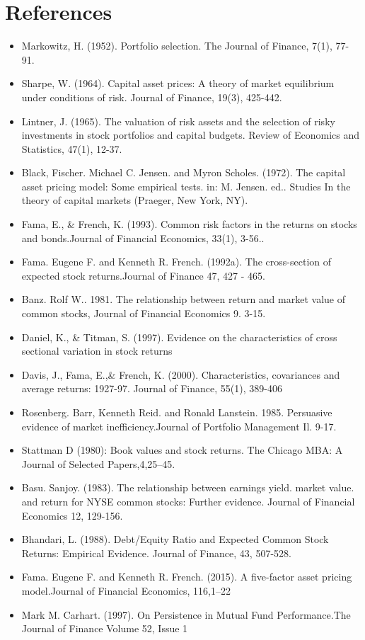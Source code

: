 \documentclass[12pt]{article}
\begin{document}
	\section{References} %
\begin{itemize}
	\item Markowitz, H. (1952). Portfolio selection. The Journal of Finance, 7(1), 77-91.
	\item Sharpe, W. (1964). Capital asset prices: A theory of market equilibrium under conditions of risk. Journal of Finance, 19(3), 425-442.
	\item Lintner, J. (1965). The valuation of risk assets and the selection of risky investments in stock portfolios and capital budgets. Review of Economics and Statistics, 47(1), 12-37.
	\item Black, Fischer. Michael C. Jensen. and Myron Scholes. (1972). The capital asset pricing model: Some empirical tests. in: M. Jensen. ed.. Studies In the theory of capital markets (Praeger, New York, NY).
	\item Fama, E., \& French, K. (1993). Common risk factors in the returns on stocks and bonds.Journal of Financial Economics, 33(1), 3-56..
	\item Fama. Eugene F. and Kenneth R. French. (1992a). The cross-section of expected stock returns.Journal of Finance 47, 427 - 465.
	\item Banz. Rolf W.. 1981. The relationship between return and market value of common stocks, Journal	of Financial Economics 9. 3-15.
	\item Daniel, K., \& Titman, S. (1997). Evidence on the characteristics of cross sectional variation in stock returns
	\item Davis, J., Fama, E.,\& French, K. (2000). Characteristics, covariances and average returns: 1927-97. Journal of Finance, 55(1), 389-406
	\item Rosenberg. Barr, Kenneth Reid. and Ronald Lanstein. 1985. Persuasive evidence of market inefficiency.Journal of Portfolio Management Il. 9-17.
	\item Stattman D (1980): Book values and stock returns. The Chicago MBA: A Journal of Selected Papers,4,25–45. 
	\item Basu. Sanjoy. (1983). The relationship between earnings yield. market value. and return for NYSE common stocks: Further evidence. Journal of Financial Economics 12, 129-156.
	\item Bhandari, L. (1988). Debt/Equity Ratio and Expected Common Stock Returns: Empirical Evidence. Journal of Finance, 43, 507-528. 
	\item Fama. Eugene F. and Kenneth R. French. (2015). A five-factor asset pricing model.Journal of Financial Economics, 116,1–22
	\item Mark M. Carhart. (1997). On Persistence in Mutual Fund Performance.The Journal of Finance Volume 52, Issue 1
\end{itemize}
\end{document}
